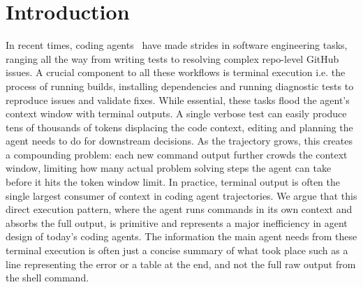 \documentclass[sigconf,review]{acmart}
\begin{document}
\thispagestyle{empty}
\pagestyle{plain}

\section{Introduction}
In recent times, coding agents~\cite{vscode_2025, wang2024opendevinopenplatformai, claude_code_2024, sweagent} have made strides in software engineering tasks, ranging all the way from writing tests to resolving complex repo-level GitHub issues. A crucial component to all these workflows is terminal execution i.e. the process of running builds, installing dependencies and running diagnostic tests to reproduce issues and validate fixes. While essential, these tasks flood the agent's context window with terminal outputs. 
A single verbose test can easily produce tens of thousands of tokens displacing the code context, editing and planning the agent needs to do for downstream decisions. 
As the trajectory grows, this creates a compounding problem: each new command output further crowds the context window, limiting how many actual problem solving steps the agent can take before it hits the token window limit. In practice, terminal output is often the single largest consumer of context in coding agent trajectories. We argue that this direct execution pattern, where the agent runs commands in its own context and absorbs the full output, is primitive and represents a major inefficiency in agent design of today's coding agents. The information the main agent needs from these terminal execution is often just a concise summary of what took place such as a line representing the error or a table at the end, and not the full raw output from the shell command. %
\end{document}
